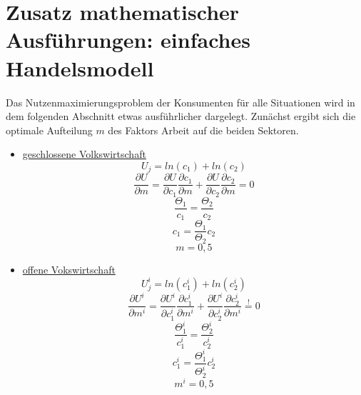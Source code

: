 \chapter{Zusatz mathematischer Ausführungen: einfaches Handelsmodell}
Das Nutzenmaximierungsproblem der Konsumenten für alle Situationen wird in dem folgenden Abschnitt etwas ausführlicher dargelegt. Zunächst ergibt sich die optimale Aufteilung $m$ des Faktors Arbeit auf die beiden Sektoren.

\begin{itemize}
\item \underline{geschlossene Volkswirtschaft}
\begin{equation} U_j=ln(c_1)+ln(c_2)\end{equation}
\begin{displaymath}\frac{\partial U}{\partial m}=\frac{\partial U}{\partial c_1}\frac{\partial c_1}{\partial m}+\frac{\partial U}{\partial c_2}\frac{\partial c_2}{\partial m}=0\end{displaymath} 
\begin{displaymath}\frac{\Theta_1}{c_1}=\frac{\Theta_2}{c_2}\end{displaymath}
\begin{equation} c_1=\frac{\Theta_1}{\Theta_2}c_2\end{equation}
\begin {equation} m=0,5\end{equation}

\item \underline{offene Vokswirtschaft}
\begin{equation} U^i_j=ln(c^i_1)+ln(c^i_2)\end{equation}
\begin{equation}\frac{\partial U^i}{\partial m^i}=\frac{\partial U^i}{\partial c_1^i}\frac{\partial c_1^i}{\partial m^i}+\frac{\partial U^i}{\partial c_2^i}\frac{\partial c_2^i}{\partial m^i}\overset{!}{=}0\end{equation}
\begin{displaymath} \frac{\Theta_1^i}{c_1^i}=\frac{\Theta_2^i}{c_2^i}\end{displaymath}\begin{equation} c_1^i=\frac{\Theta_1^i}{\Theta_2^i}c_2^i\end{equation}
\begin{equation} m^i=0,5\end{equation}
\end{itemize}


